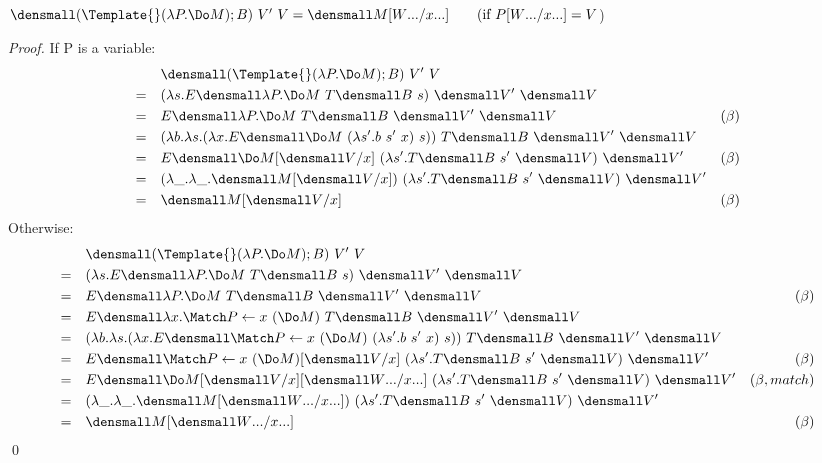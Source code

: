 \begin{lemma}
  \label{thm:template-do-match}
  \\
  $\den{(\Template{} (\lambda P. \Do M); B) ~ V' ~ V} = \den{M\subst{\many{x}}{\many{W}}}
  \qquad (\text{if } P\subst{\many{x}}{\many{W}} = V$)
\end{lemma}
\begin{proof}
  If P is a variable:
  \begin{align*}
    &\quad \den{(\Template{} (\lambda P. \Do M); B) ~ V' ~ V}\\
    =&\quad (\lambda s. E\den{\lambda P. \Do M} ~T\den{B} ~s) ~\den{V'} ~\den{V}\\
    =&\quad E\den{\lambda P. \Do M} ~T\den{B} ~\den{V'} ~\den{V} & (\beta)\\
    =&\quad (\lambda b. \lambda s.(\lambda x.E\den{\Do M} ~(\lambda s'. b ~s' ~x) ~s)) ~T\den{B} ~\den{V'} ~\den{V}\\
    =&\quad E\den{\Do M}\subst{x}{\den{V}} ~(\lambda s'. T\den{B} ~s' ~\den{V}) ~\den{V'} & (\beta)\\
    =&\quad (\lambda \_. \lambda  \_. \den{M}\subst{x}{\den{V}}) ~(\lambda s'. T\den{B} ~s' ~\den{V}) ~\den{V'}\\
    =&\quad \den{M}\subst{x}{\den{V}} & (\beta)
  \end{align*}
  Otherwise:
  \begin{align*}
    &\quad \den{(\Template{} (\lambda P. \Do M); B) ~ V' ~ V}\\
    =&\quad (\lambda s. E\den{\lambda P. \Do M} ~T\den{B} ~s) ~\den{V'} ~\den{V}\\
    =&\quad E\den{\lambda P. \Do M} ~T\den{B} ~\den{V'} ~\den{V} & (\beta)\\
    =&\quad E\den{\lambda x. \Match P \gets x ~(\Do M)} ~T\den{B} ~\den{V'} ~\den{V} \\
    =&\quad (\lambda b. \lambda s. (\lambda x. E\den{\Match P \gets x ~(\Do M)} ~(\lambda s'. b ~s' ~x) ~s)) ~T\den{B} ~\den{V'} ~\den{V} \\
    =&\quad E\den{\Match P \gets x ~(\Do M)}\subst{x}{\den{V}} ~(\lambda s'. T\den{B} ~s' ~\den{V}) ~\den{V'} & (\beta) \\
    =&\quad E\den{\Do M}\subst{x}{\den{V}}\subst{\many{x}}{\many{\den{W}}} ~(\lambda s'. T\den{B} ~s' ~\den{V}) ~\den{V'} & (\beta, match) \\
    =&\quad (\lambda \_. \lambda  \_. \den{M}\subst{\many{x}}{\many{\den{W}}}) ~(\lambda s'. T\den{B} ~s' ~\den{V}) ~\den{V'} & \\
    =&\quad \den{M}\subst{\many{x}}{\many{\den{W}}} & (\beta) \\
  \end{align*}
  \qed
\end{proof}

